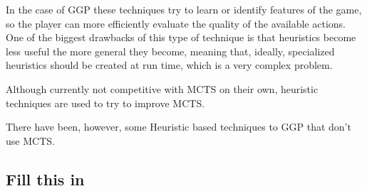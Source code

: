 In the case of \gls{GGP} these techniques try to learn or identify features of the game, so the player can more efficiently evaluate the quality of the available actions. One of the biggest drawbacks of this type of technique is that heuristics become less useful the more general they become, meaning that, ideally, specialized heuristics should be created at run time, which is a very complex problem.

Although currently not competitive with \gls{MCTS} on their own, heuristic techniques are used to try to improve \gls{MCTS}.

There have been, however, some Heuristic based techniques to \gls{GGP} that don't use \gls{MCTS}.

\subsection{Fill this in}
